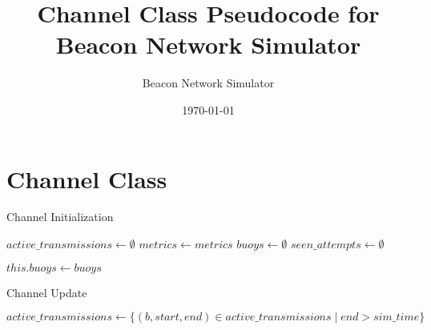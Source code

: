 \documentclass{article}
\begin{document}
\title{Channel Class Pseudocode for Beacon Network Simulator}
\author{Beacon Network Simulator}
\date{\today}
\maketitle

\section{Channel Class}

\begin{algorithm}
\caption{Channel Initialization}
\begin{algorithmic}[1]
    \State $active\_transmissions \gets \emptyset$ 
    \State $metrics \gets metrics$
    \State $buoys \gets \emptyset$
    \State $seen\_attempts \gets \emptyset$ 
\EndProcedure

    \State $this.buoys \gets buoys$
\EndProcedure
\end{algorithmic}
\end{algorithm}

\begin{algorithm}
\caption{Channel Update}
\begin{algorithmic}[1]
    \State $active\_transmissions \gets \{(b, start, end) \in active\_transmissions \mid end > sim\_time\}$ 
\EndProcedure
\end{algorithmic}
\end{algorithm}
\end{document}
